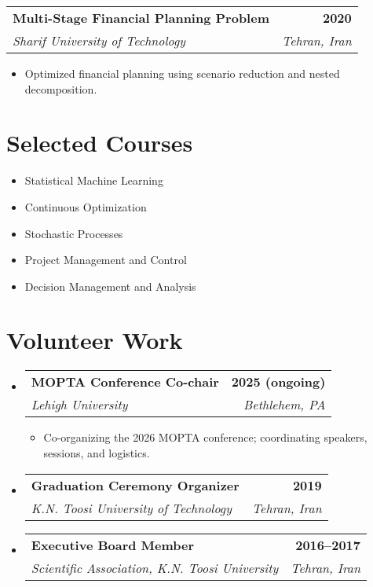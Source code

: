 \documentclass[letterpaper,10pt]{article}
\makeatletter
\newcommand{\resumeItem}[1]{\item\small{{#1 \vspace{-2pt}}}}
\newcommand{\resumeSubheading}[4]{\vspace{-2pt}\item\begin{tabular*}{1.0\textwidth}[t]{l@{\extracolsep{\fill}}r}\textbf{#1} & \textbf{\small #2} \\\textit{\small#3} & \textit{\small #4} \\\end{tabular*}\vspace{-7pt}}
\newcommand{\resumeSubHeadingListStart}{\begin{itemize}[leftmargin=0.1in, label={}]}
\newcommand{\resumeSubHeadingListEnd}{\end{itemize}}
\newcommand{\resumeItemListStart}{\begin{itemize}[leftmargin=0.1in]}
\newcommand{\resumeItemListEnd}{\end{itemize}\vspace{-5pt}}
\makeatother
\begin{document}
    \resumeSubheading
      {Multi-Stage Financial Planning Problem}{2020}
      {Sharif University of Technology}{Tehran, Iran}
      \resumeItemListStart
        \resumeItem{Optimized financial planning using scenario reduction and nested decomposition.}
      \resumeItemListEnd


\section{Selected Courses}
\begin{multicols}{2}
\small
  \begin{itemize}[leftmargin=0.15in, label={}]
    \setlength{\itemsep}{0.5pt}
    \item Statistical Machine Learning
    \item Continuous Optimization
    \item Stochastic Processes
  \end{itemize}
  \columnbreak
  \begin{itemize}[leftmargin=0.15in, label={}]
    \setlength{\itemsep}{0.5pt}
    \item Project Management and Control
    \item Decision Management and Analysis
  \end{itemize}
\end{multicols}

\section{Volunteer Work}
  \resumeSubHeadingListStart

    \resumeSubheading
      {MOPTA Conference Co-chair}{2025 (ongoing)}
      {Lehigh University}{Bethlehem, PA}
      \resumeItemListStart
        \resumeItem{Co-organizing the 2026 MOPTA conference; coordinating speakers, sessions, and logistics.}
      \resumeItemListEnd

    \resumeSubheading
      {Graduation Ceremony Organizer}{2019}
      {K.N. Toosi University of Technology}{Tehran, Iran}

    \resumeSubheading
      {Executive Board Member}{2016--2017}
      {Scientific Association, K.N. Toosi University}{Tehran, Iran}

  \resumeSubHeadingListEnd
\end{document}
